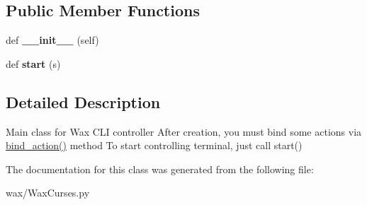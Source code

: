 \subsection*{Public Member Functions}
\begin{DoxyCompactItemize}
\item 
def {\bfseries \+\_\+\+\_\+init\+\_\+\+\_\+} (self)\hypertarget{classwax_1_1WaxCurses_1_1WaxCurses_a8b99fe79c8a55a1ca31a6a3fff6a03a0}{}\label{classwax_1_1WaxCurses_1_1WaxCurses_a8b99fe79c8a55a1ca31a6a3fff6a03a0}

\item 
def {\bfseries start} (s)\hypertarget{classwax_1_1WaxCurses_1_1WaxCurses_adfa97985ee52aa2f691a8672bb716016}{}\label{classwax_1_1WaxCurses_1_1WaxCurses_adfa97985ee52aa2f691a8672bb716016}

\end{DoxyCompactItemize}


\subsection{Detailed Description}
Main class for Wax C\+LI controller After creation, you must bind some actions via \hyperlink{classwax_1_1Core_1_1WaxInterface_af10d87f79dc119f4d5f30cd70ef9feb9}{bind\+\_\+action()} method To start controlling terminal, just call start() 

The documentation for this class was generated from the following file\+:\begin{DoxyCompactItemize}
\item 
wax/Wax\+Curses.\+py\end{DoxyCompactItemize}
